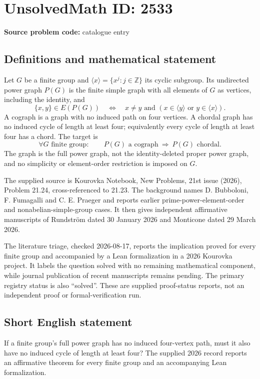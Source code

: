 \documentclass[11pt]{article}
\newcommand{\Z}{\mathbb{Z}}
\begin{document}
\section*{UnsolvedMath ID: 2533}
\textbf{Source problem code:} catalogue entry
\subsection{Definitions and mathematical statement}
Let $G$ be a finite group and $\langle x\rangle=\{x^j:j\in\Z\}$ its cyclic subgroup. Its undirected power graph $P(G)$ is the finite simple graph with all elements of $G$ as vertices, including the identity, and
\[
\{x,y\}\in E(P(G))\quad\Longleftrightarrow\quad
x\ne y\text{ and }(x\in\langle y\rangle\text{ or }y\in\langle x\rangle).
\]
A cograph is a graph with no induced path on four vertices. A chordal graph has no induced cycle of length at least four; equivalently every cycle of length at least four has a chord. The target is
\[
\forall G\text{ finite group}:\qquad
P(G)\text{ a cograph}\ \Longrightarrow\ P(G)\text{ chordal}.
\]
The graph is the full power graph, not the identity-deleted proper power graph, and no simplicity or element-order restriction is imposed on $G$.

The supplied source is Kourovka Notebook, New Problems, 21st issue (2026), Problem 21.24, cross-referenced to 21.23. The background names D. Bubboloni, F. Fumagalli and C. E. Praeger and reports earlier prime-power-element-order and nonabelian-simple-group cases. It then gives independent affirmative manuscripts of Rundström dated 30 January 2026 and Monticone dated 29 March 2026.

The literature triage, checked 2026-08-17, reports the implication proved for every finite group and accompanied by a Lean formalization in a 2026 Kourovka project. It labels the question solved with no remaining mathematical component, while journal publication of recent manuscripts remains pending. The primary registry status is also ``solved''. These are supplied proof-status reports, not an independent proof or formal-verification run.
\subsection{Short English statement}
If a finite group's full power graph has no induced four-vertex path, must it also have no induced cycle of length at least four? The supplied 2026 record reports an affirmative theorem for every finite group and an accompanying Lean formalization.
\end{document}
